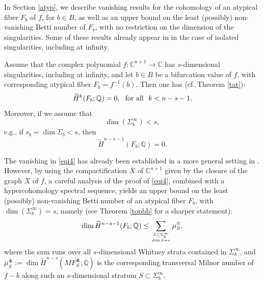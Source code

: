 \documentclass[12pt,leqno,twoside]{amsart}
\theoremstyle{remark}
\theoremstyle{remark}
\theoremstyle{definition}
\theoremstyle{remark}
\theoremstyle{remark}
\theoremstyle{remark}
\numberwithin{equation}{section}  %
\def\be{\begin{equation}}
\def\ee{\end{equation}}
\newcommand{\bC}{\mathbb{C}}
\newcommand{\bQ}{\mathbb{Q}}
\newcommand{\of}{\overline{f}}
\newcommand{\oX}{\overline{X}}
\newcommand{\wti}{\widetilde}
\begin{document}
\medskip

In Section \ref{atyp}, we describe vanishing results for the cohomology of an atypical fiber $F_b$ of $f$, for $b \in B$, as well as an upper bound on the least (possibly) non-vanishing Betti number of $F_b$, with no restriction on the dimension of the singularities. Some of these results already appear in \cite[Sections 6.2, 6.3]{Di} in the case of isolated singularities, including at infinity. 

Assume that the complex polynomial $f\colon \bC^{n+1} \to \bC$ has $s$-dimensional singularities, including at infinity, and let $b \in B$ be a bifurcation value of $f$, with corresponding atypical fiber $F_b=f^{-1}(b)$. Then one has (cf. Theorem \ref{tat}):
\be\label{eqi4}
\wti{H}^k(F_b;\bQ)=0, \ \ {\rm for \ all} \ \ k < n-s-1.
\ee
Moreover, if we assume that 
\[\dim(\Sigma_b^\infty) <s,\] 
e.g., if $s_b=\dim \Sigma_b <s$, then 
\[  \wti{H}^{n-s-1}(F_b;\bQ)=0.\]

The vanishing in \eqref{eqi4} has already been established in a more general setting in \cite{Bre}. However, by using the compactification $\oX$ of $\bC^{n+1}$ given by the closure of the graph $X$ of $f$, a careful analysis of the proof of \eqref{eqi4}, combined with a hypercohomology spectral sequence, yields an upper bound on the least (possibly) non-vanishing Betti number of an atypical fiber $F_b$, with $\dim(\Sigma_b^\infty) =s$, namely (see Theorem \ref{topbb} for a sharper statement):
\be\label{bboundi}
\dim  \wti{H}^{n-s-1}(F_b;\bQ) \leq \sum_{S \subset \Sigma_b^\infty \atop \dim S=s} \mu^\pitchfork_S,
\ee
where the sum runs over all $s$-dimensional Whitney strata contained in $\Sigma_b^\infty$, and $\mu^\pitchfork_S:=\dim \wti{H}^{n-s}(MF^\pitchfork_{S};\bQ)$ is the corresponding transversal Milnor number of $\of-b$ along such an $s$-dimensional stratum $S \subset \Sigma_b^\infty$.


\end{document}
